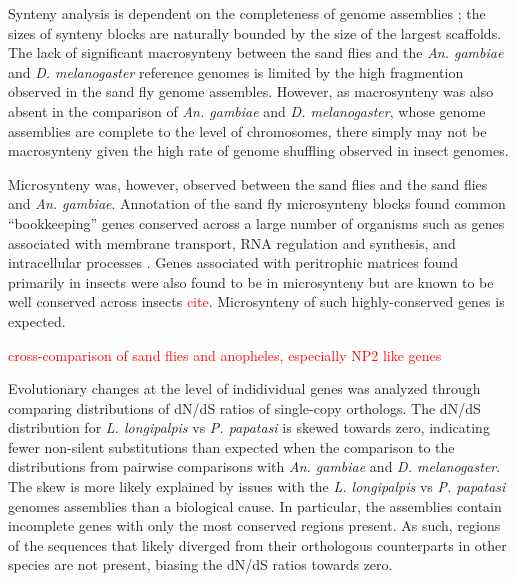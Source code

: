 Synteny analysis is dependent on the completeness of genome assemblies \cite{Heger2007}; the sizes of synteny blocks are naturally bounded by the size of the largest scaffolds.  The lack of significant macrosynteny between the sand flies and the \emph{An. gambiae} and \emph{D. melanogaster} reference genomes is limited by the high fragmention observed in the sand fly genome assembles.  However, as macrosynteny was also absent in the comparison of \emph{An. gambiae} and \emph{D. melanogaster}, whose genome assemblies are complete to the level of chromosomes, there simply may not be macrosynteny given the high rate of genome shuffling observed in insect genomes.

Microsynteny was, however, observed between the sand flies and the sand flies and \emph{An. gambiae}.  Annotation of the sand fly microsynteny blocks found common ``bookkeeping'' genes conserved across a large number of organisms such as genes associated with membrane transport, RNA regulation and synthesis, and intracellular processes \cite{Zdobnov2007}.  Genes associated with peritrophic matrices found primarily in insects were also found to be in microsynteny but are known to be well conserved across insects \textcolor{red}{cite}.  Microsynteny of such highly-conserved genes is expected.

\textcolor{red}{cross-comparison of sand flies and anopheles, especially NP2 like genes}

Evolutionary changes at the level of indidividual genes was analyzed through comparing distributions of dN/dS ratios of single-copy orthologs.  The dN/dS distribution for \emph{L. longipalpis} vs \emph{P. papatasi} is skewed towards zero, indicating fewer non-silent substitutions than expected when the comparison to the distributions from pairwise comparisons with \emph{An. gambiae} and \emph{D. melanogaster}.  The skew is more likely explained by issues with the \emph{L. longipalpis} vs \emph{P. papatasi} genomes assemblies than a biological cause.  In particular, the assemblies contain incomplete genes with only the most conserved regions present.  As such, regions of the sequences that likely diverged from their orthologous counterparts in other species are not present, biasing the dN/dS ratios towards zero.






